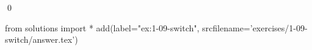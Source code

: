
\begin{ex}
  \label{ex:1-09-switch}
  
  \qed
\end{ex}
\begin{python0}
from solutions import *
add(label="ex:1-09-switch",
    srcfilename='exercises/1-09-switch/answer.tex')
\end{python0}
